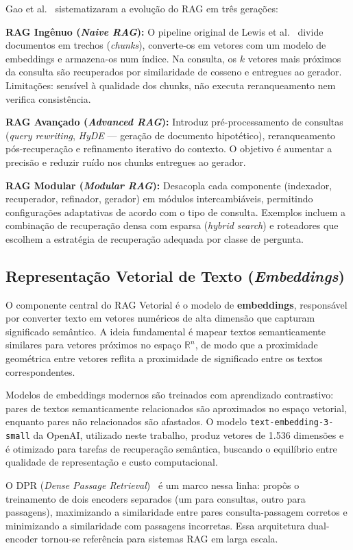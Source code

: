 \documentclass[conference]{IEEEtran}
\begin{document}
Gao et al.~\cite{gao2024survey} sistematizaram a evolução do
RAG em três gerações:

\textbf{RAG Ingênuo (\textit{Naive RAG}):}
O pipeline original de Lewis et al.~\cite{lewis2020rag}
divide documentos em trechos (\textit{chunks}), converte-os em
vetores com um modelo de embeddings e armazena-os num índice.
Na consulta, os $k$ vetores mais próximos da consulta são
recuperados por similaridade de cosseno e entregues ao gerador.
Limitações: sensível à qualidade dos chunks, não executa
reranqueamento nem verifica consistência.

\textbf{RAG Avançado (\textit{Advanced RAG}):}
Introduz pré-processamento de consultas (\textit{query rewriting},
\textit{HyDE} — geração de documento hipotético), reranqueamento
pós-recuperação e refinamento iterativo do contexto.
O objetivo é aumentar a precisão e reduzir ruído nos chunks
entregues ao gerador.

\textbf{RAG Modular (\textit{Modular RAG}):}
Desacopla cada componente (indexador, recuperador, refinador,
gerador) em módulos intercambiáveis, permitindo configurações
adaptativas de acordo com o tipo de consulta.
Exemplos incluem a combinação de recuperação densa com esparsa
(\textit{hybrid search}) e roteadores que escolhem a estratégia
de recuperação adequada por classe de pergunta.

\subsection{Representação Vetorial de Texto (\textit{Embeddings})}

O componente central do RAG Vetorial é o modelo de
\textbf{embeddings}, responsável por converter texto em vetores
numéricos de alta dimensão que capturam significado semântico.
A ideia fundamental é mapear textos semanticamente similares para
vetores próximos no espaço $\mathbb{R}^n$, de modo que a
proximidade geométrica entre vetores reflita a proximidade de
significado entre os textos correspondentes.

Modelos de embeddings modernos são treinados com aprendizado
contrastivo: pares de textos semanticamente relacionados são
aproximados no espaço vetorial, enquanto pares não relacionados
são afastados.
O modelo \texttt{text-embedding-3-small} da OpenAI, utilizado
neste trabalho, produz vetores de 1.536 dimensões e é otimizado
para tarefas de recuperação semântica, buscando o equilíbrio
entre qualidade de representação e custo computacional.

O DPR (\textit{Dense Passage Retrieval})~\cite{karpukhin2020dpr}
é um marco nessa linha: propôs o treinamento de dois encoders
separados (um para consultas, outro para passagens), maximizando
a similaridade entre pares consulta-passagem corretos e
minimizando a similaridade com passagens incorretas.
Essa arquitetura dual-encoder tornou-se referência para sistemas
RAG em larga escala.
\end{document}
